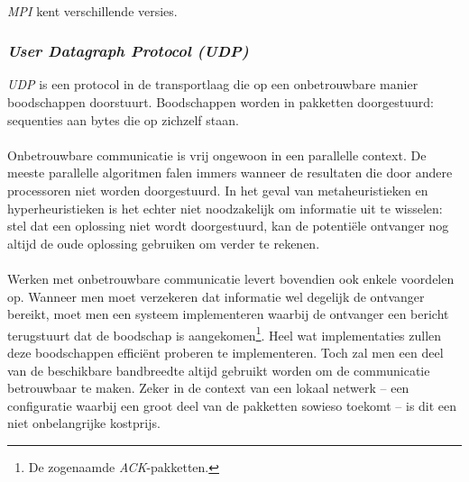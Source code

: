 \paragraph{}
\emph{MPI} kent verschillende versies. %

\subsubsection{\emph{User Datagraph Protocol (UDP)}}

\emph{UDP} is een protocol in de transportlaag die op een onbetrouwbare manier boodschappen doorstuurt. Boodschappen worden in pakketten doorgestuurd: sequenties aan bytes die op zichzelf staan.

\paragraph{}
Onbetrouwbare communicatie is vrij ongewoon in een parallelle context. De meeste parallelle algoritmen falen immers wanneer de resultaten die door andere processoren niet worden doorgestuurd. In het geval van metaheuristieken en hyperheuristieken is het echter niet noodzakelijk om informatie uit te wisselen: stel dat een oplossing niet wordt doorgestuurd, kan de potenti\"ele ontvanger nog altijd de oude oplossing gebruiken om verder te rekenen.

\paragraph{}
Werken met onbetrouwbare communicatie levert bovendien ook enkele voordelen op. Wanneer men moet verzekeren dat informatie wel degelijk de ontvanger bereikt, moet men een systeem implementeren waarbij de ontvanger een bericht terugstuurt dat de boodschap is aangekomen\footnote{De zogenaamde \emph{ACK}-pakketten.}. Heel wat implementaties zullen deze boodschappen effici\"ent proberen te implementeren. Toch zal men een deel van de beschikbare bandbreedte altijd gebruikt worden om de communicatie betrouwbaar te maken. Zeker in de context van een lokaal netwerk -- een configuratie waarbij een groot deel van de pakketten sowieso toekomt -- is dit een niet onbelangrijke kostprijs.


